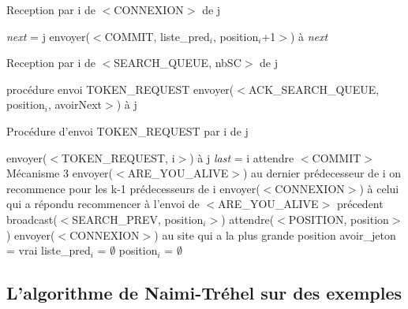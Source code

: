 \documentclass[a4paper,12pt]{article}
\newcommand{\nt}{Naimi-Tréhel }
\newcommand{\last}{\textit{last} }
\newcommand{\next}{\textit{next} }
\begin{document}
\begin{algorithm}[t]
\caption{Reception par i de $<$CONNEXION$>$ de j}
\label{algo_naimi_trehel_amelioration_recpt_CX}
\begin{algorithmic}[1]
\STATE \next = j
\STATE envoyer($<$COMMIT, liste\_pred$_{i}$, position$_{i}$+1$>$) à \next
\end{algorithmic}
\end{algorithm}

\begin{algorithm}[t]
\caption{Reception par i de $<$SEARCH\_QUEUE, nbSC$>$ de j}
\label{algo_naimi_trehel_amelioration_recpt_SQ}
\begin{algorithmic}[1]
  \STATE procédure envoi TOKEN\_REQUEST
\ELSE
    \STATE envoyer($<$ACK\_SEARCH\_QUEUE, position$_{i}$, avoirNext$>$) à j
  \ENDIF  
\ENDIF   
\end{algorithmic}
\end{algorithm}


\begin{algorithm}[t]
\caption{Procédure d'envoi TOKEN\_REQUEST par i de j}
\label{algo_naimi_trehel_amelioration_envoi_TR}
\begin{algorithmic}[1]
\STATE envoyer($<$TOKEN\_REQUEST, i$>$) à j
\IF{j == \last}
  \STATE \last = i
\ENDIF
\STATE attendre $<$COMMIT$>$
  \STATE Mécanisme 3
\ELSE
  \STATE envoyer($<$ARE\_YOU\_ALIVE$>$) au dernier prédecesseur de i
    \STATE on recommence pour les k-1 prédecesseurs de i
  \ENDIF
    \STATE envoyer($<$CONNEXION$>$) à celui qui a répondu
    \STATE recommencer à l'envoi de $<$ARE\_YOU\_ALIVE$>$ précedent
  \ELSE
    \STATE broadcast($<$SEARCH\_PREV, position$_{i}>$)
    \STATE attendre($<$POSITION, position$>$)
      \STATE envoyer($<$CONNEXION$>$) au site qui a la plus grande position
    \ELSE
      \STATE avoir\_jeton = vrai
      \STATE liste\_pred$_{i}$ = $\emptyset$
      \STATE position$_{i}$ = $\emptyset$
    \ENDIF
  \ENDIF
\ENDIF  
    
\end{algorithmic}
\end{algorithm}

\subsection{L'algorithme de \nt sur des exemples}
\end{document}
